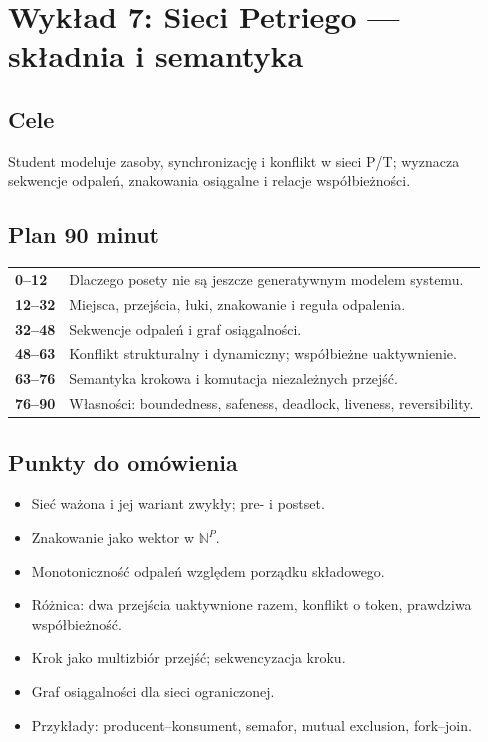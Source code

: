 \documentclass[11pt,a4paper]{article}
\begin{document}
\section{Wykład 7: Sieci Petriego --- składnia i semantyka}

\subsection{Cele}
Student modeluje zasoby, synchronizację i konflikt w sieci P/T; wyznacza sekwencje odpaleń, znakowania osiągalne i relacje współbieżności.

\subsection{Plan 90 minut}
\begin{center}\small\begin{tabularx}{0.96\textwidth}{@{}>{\bfseries}p{18mm}X@{}}
0--12 & Dlaczego posety nie są jeszcze generatywnym modelem systemu.\\
12--32 & Miejsca, przejścia, łuki, znakowanie i reguła odpalenia.\\
32--48 & Sekwencje odpaleń i graf osiągalności.\\
48--63 & Konflikt strukturalny i dynamiczny; współbieżne uaktywnienie.\\
63--76 & Semantyka krokowa i komutacja niezależnych przejść.\\
76--90 & Własności: boundedness, safeness, deadlock, liveness, reversibility.\\
\end{tabularx}\end{center}

\subsection{Punkty do omówienia}
\begin{itemize}
\item Sieć ważona i jej wariant zwykły; pre- i postset.
\item Znakowanie jako wektor w $\mathbb{N}^P$.
\item Monotoniczność odpaleń względem porządku składowego.
\item Różnica: dwa przejścia uaktywnione razem, konflikt o token, prawdziwa współbieżność.
\item Krok jako multizbiór przejść; sekwencyzacja kroku.
\item Graf osiągalności dla sieci ograniczonej.
\item Przykłady: producent--konsument, semafor, mutual exclusion, fork--join.
\end{itemize}
\end{document}
